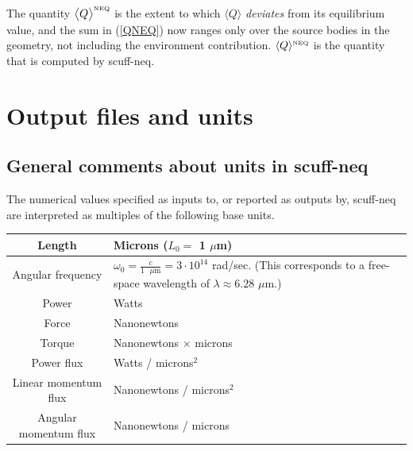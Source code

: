 \documentclass[letterpaper]{article}
\begin{document}
The quantity $\big\langle Q\big\rangle^{\hbox{\tiny{NEQ}}}$
is the extent to which $\big\langle Q\big\rangle$
\textit{deviates} from its equilibrium value, and
the sum in (\ref{QNEQ}) now ranges only over
the source bodies in the geometry, not including
the environment contribution.
$\langle Q \rangle^{\hbox{\tiny{NEQ}}}$ is the
quantity that is computed by {\sc scuff-neq}.

\newpage
\section{Output files and units}

\subsection{General comments about units in {\sc scuff-neq}}

The numerical values specified as inputs to, or reported
as outputs by, {\sc scuff-neq} are interpreted as multiples
of the following base units.

\begin{center}
\renewcommand{\arraystretch}{1.5}
\begin{tabular}{|c|p{}|}\hline
 Length            & Microns ($L_0=$ 1 $\mu$m)
\\\hline
 Angular frequency & $\omega_0=\frac{c}{1\text{ $\mu$m}}
                      =3\cdot 10^{14}$ rad/sec. 
                     (This corresponds to a free-space 
                      wavelength of 
                      $\lambda\approx 6.28$ $\mu$m.)
\\\hline
 Power             & Watts 
\\\hline
 Force             & Nanonewtons
\\\hline
 Torque            & Nanonewtons $\times$ microns
\\\hline
 Power flux        & Watts / microns$^2$
\\\hline
 Linear momentum flux  & Nanonewtons / microns$^2$
\\\hline
 Angular momentum flux & Nanonewtons / microns
\\\hline
\end{tabular}
\end{center}
\renewcommand{\arraystretch}{1.0}
\end{document}
